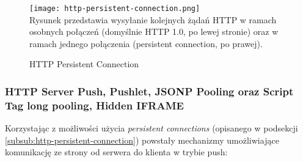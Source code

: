 \begin{figure}[H]
  \caption[HTTP Persistent Connection]{HTTP Persistent Connection}
  \centering
    \texttt{[image: http-persistent-connection.png]} \\
    Rysunek przedstawia wysyłanie kolejnych żądań HTTP w ramach osobnych połączeń (domyślnie HTTP 1.0, po lewej stronie) oraz w ramach jednego połączenia (persistent connection, po prawej).
\end{figure}

\subsubsection{HTTP Server Push, Pushlet, JSONP Pooling oraz Script Tag long pooling, Hidden IFRAME}

Korzystając z możliwości użycia \emph{persistent connections} (opisanego w podsekcji \ref{subsub:http-persistent-connection}) powstały mechanizmy umożliwiające komunikację ze strony od serwera do klienta w trybie push:

